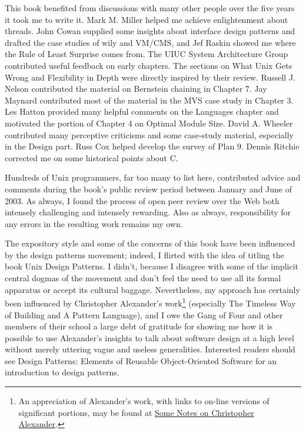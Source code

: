 \documentclass[12pt,oneside]{book}
\begin{document}
\begin{common-format}
This book benefited from discussions with many other people over the five years it took me to write it. Mark M. Miller helped me achieve enlightenment about threads. John Cowan supplied some insights about interface design patterns and drafted the case studies of wily and VM/CMS, and Jef Raskin showed me where the Rule of Least Surprise comes from. The UIUC System Architecture Group contributed useful feedback on early chapters. The sections on What Unix Gets Wrong and Flexibility in Depth were directly inspired by their review. Russell J. Nelson contributed the material on Bernstein chaining in Chapter 7. Jay Maynard contributed most of the material in the MVS case study in Chapter 3. Les Hatton provided many helpful comments on the Languages chapter and motivated the portion of Chapter 4 on Optimal Module Size. David A. Wheeler contributed many perceptive criticisms and some case-study material, especially in the Design part. Russ Cox helped develop the survey of Plan 9. Dennis Ritchie corrected me on some historical points about C.

Hundreds of Unix programmers, far too many to list here, contributed advice and comments during the book's public review period between January and June of 2003. As always, I found the process of open peer review over the Web both intensely challenging and intensely rewarding. Also as always, responsibility for any errors in the resulting work remains my own.

The expository style and some of the concerns of this book have been influenced by the design patterns movement; indeed, I flirted with the idea of titling the book Unix Design Patterns. I didn't, because I disagree with some of the implicit central dogmas of the movement and don't feel the need to use all its formal apparatus or accept its cultural baggage. Nevertheless, my approach has certainly been influenced by Christopher Alexander's work\footnote{An appreciation of Alexander's work, with links to on-line versions of significant portions, may be found at \href{http://www.math.utsa.edu/sphere/salingar/Chris.text.html}{Some Notes on Christopher Alexander}.} (especially The Timeless Way of Building and A Pattern Language), and I owe the Gang of Four and other members of their school a large debt of gratitude for showing me how it is possible to use Alexander's insights to talk about software design at a high level without merely uttering vague and useless generalities. Interested readers should see Design Patterns: Elements of Reusable Object-Oriented Software \cite{GangOfFour} for an introduction to design patterns.


\end{common-format}
\end{document}
